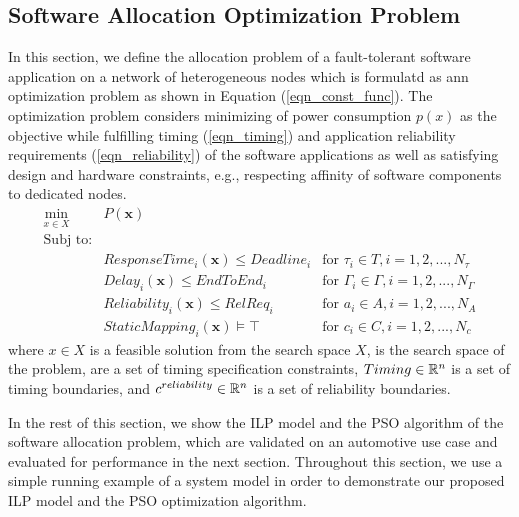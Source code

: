 \subsection{Software Allocation Optimization Problem	}\label{sec_allocation}
In this section, we define the allocation problem of a fault-tolerant software application on a network of heterogeneous nodes which is formulatd as ann optimization problem as shown in Equation (\ref{eqn_const_func}). The optimization problem considers minimizing of power consumption $p(x)$ as the objective while fulfilling timing (\ref{eqn_timing}) and application reliability requirements (\ref{eqn_reliability}) of the software applications as well as satisfying design and hardware constraints, e.g., respecting affinity of software components to dedicated nodes.
\begin{align}
\label{eqn_optimization}
\min_{x\in X}\;\;& P(\textbf{x}) & \\
\text{Subj to:} &\\
& ResponseTime_i(\textbf{x}) \leq Deadline_i & \text{for }\tau_i\in T, i=1,2,...,N_\tau \\ 
\label{eqn_e2e}
&Delay_i(\textbf{x}) \leq EndToEnd_i & \text{for }\Gamma_i\in \Gamma, i=1,2,...,N_\Gamma \\
\label{eqn_reliability}
&Reliability_i(\textbf{x}) \leq RelReq_i & \text{for }a_i\in A, i=1,2,...,N_A\\
\label{eqn_mapping}
&StaticMapping_i(\textbf{x})\models \top & \text{for }c_i\in C, i=1,2,...,N_c
\end{align}
where $x\in X$ is a feasible solution from the search space
$X$, is the search space of the problem,  are a set of timing specification constraints, $Timing\in \Bbb R^n$ is a set of timing boundaries, and $c^{reliability}\in \Bbb R^n$ is a set of reliability boundaries.

In the rest of this section, we show the ILP model and the PSO algorithm of the software allocation problem, which are validated on an automotive use case and evaluated for performance in the next section. Throughout this section, we use a simple running example of a system model in order to demonstrate our proposed ILP model and the PSO optimization algorithm.

